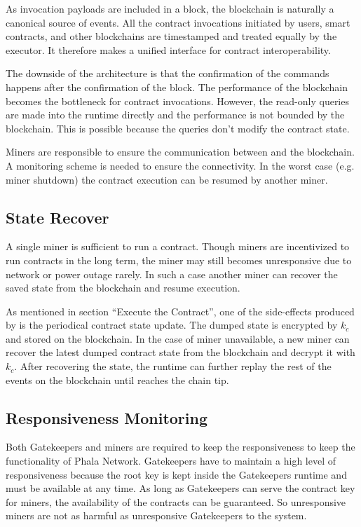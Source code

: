 As invocation payloads are included in a block, the blockchain is naturally a canonical source of events. All the contract invocations initiated by users, smart contracts, and other blockchains are timestamped and treated equally by the executor. It therefore makes a unified interface for contract interoperability.

The downside of the architecture is that the confirmation of the commands happens after the confirmation of the block. The performance of the blockchain becomes the bottleneck for contract invocations. However, the read-only queries are made into the runtime directly and the performance is not bounded by the blockchain. This is possible because the queries don't modify the contract state.

Miners are responsible to ensure the communication between \pruntime and the blockchain. A monitoring scheme is needed to ensure the connectivity. In the worst case (e.g.\,miner shutdown) the contract execution can be resumed by another miner.

\subsection{State Recover}

A single miner is sufficient to run a contract. Though miners are incentivized to run contracts in the long term, the miner may still becomes unresponsive due to network or power outage rarely. In such a case another miner can recover the saved state from the blockchain and resume execution.

As mentioned in section ``Execute the Contract'', one of the side-effects produced by \pruntime  is the periodical contract state update. The dumped state is encrypted by $k_c$ and stored on the blockchain. In the case of miner unavailable, a new miner can recover the latest dumped contract state from the blockchain and decrypt it with $k_c$. After recovering the state, the runtime can further replay the rest of the events on the blockchain until reaches the chain tip.

\subsection{Responsiveness Monitoring}

Both Gatekeepers and miners are required to keep the responsiveness to keep the functionality of Phala Network. Gatekeepers have to maintain a high level of responsiveness because the root key is kept inside the Gatekeepers runtime and must be available at any time. As long as Gatekeepers can serve the contract key for miners, the availability of the contracts can be guaranteed. So unresponsive miners are not as harmful as unresponsive Gatekeepers to the system.

